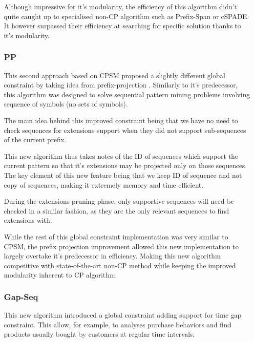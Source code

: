 \documentclass{eplmastersthesis}
\begin{document}
Although impressive for it's modularity, the efficiency of this algorithm didn't quite caught up to specialised non-CP algorithm such as Prefix-Span or cSPADE. It however surpassed their efficiency at searching for specific solution thanks to it's modularity.

\subsubsection{PP}

This second approach based on CPSM proposed a slightly different global constraint by taking idea from prefix-projection \cite{kemmar2015prefix}. Similarly to it's predecessor, this algorithm was designed to solve sequential pattern mining problems involving sequence of symbols (no sets of symbols).\newline

The main idea behind this improved constraint being that we have no need to check sequences for extensions support when they did not support sub-sequences of the current prefix. \newline

This new algorithm thus takes notes of the ID of sequences which support the current pattern so that it's extensions may be projected only on those sequences. The key element of this new feature being that we keep ID of sequence and not copy of sequences, making it extremely memory and time efficient. \newline

During the extensions pruning phase, only supportive sequences will need be checked in a similar fashion, as they are the only relevant sequences to find extensions with. \newline

While the rest of this global constraint implementation was very similar to CPSM, the prefix projection improvement allowed this new implementation to largely overtake it's predecessor in efficiency. Making this new algorithm competitive with state-of-the-art non-CP method while keeping the improved modularity inherent to CP algorithm.

\subsubsection{Gap-Seq}

This new algorithm introduced a global constraint adding support for time gap constraint. This allow, for example, to analyses purchase behaviors and find products usually bought by customers at regular time intervals. \newline
\end{document}
